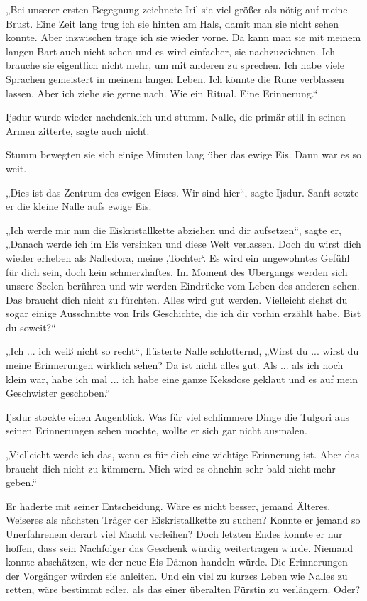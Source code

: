 „Bei unserer ersten Begegnung zeichnete Iril sie viel größer als nötig auf meine Brust. Eine Zeit lang trug ich sie hinten am Hals, damit man sie nicht sehen konnte. Aber inzwischen trage ich sie wieder vorne. Da kann man sie mit meinem langen Bart auch nicht sehen und es wird einfacher, sie nachzuzeichnen. Ich brauche sie eigentlich nicht mehr, um mit anderen zu sprechen. Ich habe viele Sprachen gemeistert in meinem langen Leben. Ich könnte die Rune verblassen lassen. Aber ich ziehe sie gerne nach. Wie ein Ritual. Eine Erinnerung.“

Ijsdur wurde wieder nachdenklich und stumm. Nalle, die primär still in seinen Armen zitterte, sagte auch nicht.

Stumm bewegten sie sich einige Minuten lang über das ewige Eis. Dann war es so weit.

„Dies ist das Zentrum des ewigen Eises. Wir sind hier“, sagte Ijsdur. Sanft setzte er die kleine Nalle aufs ewige Eis.

„Ich werde mir nun die Eiskristallkette abziehen und dir aufsetzen“, sagte er, „Danach werde ich im Eis versinken und diese Welt verlassen. Doch du wirst dich wieder erheben als Nalledora, meine ‚Tochter‘. Es wird ein ungewohntes Gefühl für dich sein, doch kein schmerzhaftes. Im Moment des Übergangs werden sich unsere Seelen berühren und wir werden Eindrücke vom Leben des anderen sehen. Das braucht dich nicht zu fürchten. Alles wird gut werden. Vielleicht siehst du sogar einige Ausschnitte von Irils Geschichte, die ich dir vorhin erzählt habe. Bist du soweit?“

„Ich ... ich weiß nicht so recht“, flüsterte Nalle schlotternd, „Wirst du ... wirst du meine Erinnerungen wirklich sehen? Da ist nicht alles gut. Als ... als ich noch klein war, habe ich mal ... ich habe eine ganze Keksdose geklaut und es auf mein Geschwister geschoben.“

Ijsdur stockte einen Augenblick. Was für viel schlimmere Dinge die Tulgori aus seinen Erinnerungen sehen mochte, wollte er sich gar nicht ausmalen.

„Vielleicht werde ich das, wenn es für dich eine wichtige Erinnerung ist. Aber das braucht dich nicht zu kümmern. Mich wird es ohnehin sehr bald nicht mehr geben.“

Er haderte mit seiner Entscheidung. Wäre es nicht besser, jemand Älteres, Weiseres als nächsten Träger der Eiskristallkette zu suchen? Konnte er jemand so Unerfahrenem derart viel Macht verleihen? Doch letzten Endes konnte er nur hoffen, dass sein Nachfolger das Geschenk würdig weitertragen würde. Niemand konnte abschätzen, wie der neue Eis-Dämon handeln würde. Die Erinnerungen der Vorgänger würden sie anleiten. Und ein viel zu kurzes Leben wie Nalles zu retten, wäre bestimmt edler, als das einer überalten Fürstin zu verlängern. Oder?

